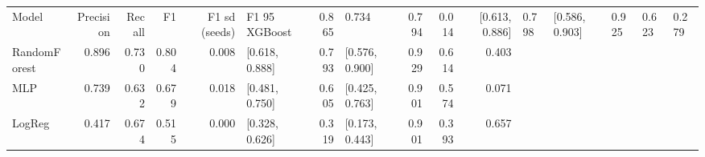 \begin{tabular}{lrrrrlrlrrr}
\toprule
Model & Precision & Recall & F1 & F1 sd (seeds) & F1 95%
\midrule
XGBoost & 0.865 & 0.734 & 0.794 & 0.014 & [0.613, 0.886] & 0.798 & [0.586, 0.903] & 0.925 & 0.623 & 0.279 \\
RandomForest & 0.896 & 0.730 & 0.804 & 0.008 & [0.618, 0.888] & 0.793 & [0.576, 0.900] & 0.929 & 0.614 & 0.403 \\
MLP & 0.739 & 0.632 & 0.679 & 0.018 & [0.481, 0.750] & 0.605 & [0.425, 0.763] & 0.901 & 0.574 & 0.071 \\
LogReg & 0.417 & 0.674 & 0.515 & 0.000 & [0.328, 0.626] & 0.319 & [0.173, 0.443] & 0.901 & 0.393 & 0.657 \\
\bottomrule
\end{tabular}
